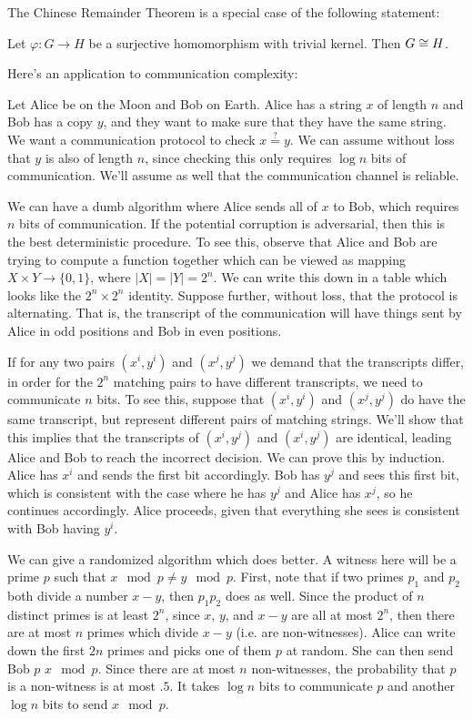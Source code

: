 The Chinese Remainder Theorem is a special case of the following statement:

\begin{lemma}
	Let $\varphi: G\rightarrow H$ be a surjective homomorphism with trivial kernel.  Then $G\cong H$.
\end{lemma}

Here's an application to communication complexity:

\begin{example}
Let Alice be on the Moon and Bob on Earth.  Alice has a string $x$ of length $n$ and Bob has a copy $y$, and they want to make sure that they have the same string. We want a communication protocol to check $x\overset{?}{=}y$.  We can assume without loss that $y$ is also of length $n$, since checking this only requires $\log{n}$ bits of communication.  We'll assume as well that the communication channel is reliable.

We can have a dumb algorithm where Alice sends all of $x$ to Bob, which requires $n$ bits of communication.  If the potential corruption is adversarial, then this is the best deterministic procedure.  To see this, observe that Alice and Bob are trying to compute a function together which can be viewed as mapping $X\times Y\rightarrow \{0,1\}$, where $|X|=|Y|=2^n$.  We can write this down in a table which looks like the $2^n\times 2^n$ identity.  Suppose further, without loss, that the protocol is alternating.  That is, the transcript of the communication will have things sent by Alice in odd positions and Bob in even positions.  

If for any two pairs $(x^i,y^i)$ and $(x^j,y^j)$ we demand that the transcripts differ, in order for the $2^n$ matching pairs to have different transcripts, we need to communicate $n$ bits.  To see this, suppose that $(x^i,y^i)$ and $(x^j,y^j)$ do have the same transcript, but represent different pairs of matching strings.  We'll show that this implies that the transcripts of $(x^i,y^j)$ and $(x^i,y^j)$ are identical, leading Alice and Bob to reach the incorrect decision.  We can prove this by induction.  Alice has $x^i$ and sends the first bit accordingly.  Bob has $y^j$ and sees this first bit, which is consistent with the case where he has $y^j$ and Alice has $x^j$, so he continues accordingly. Alice proceeds, given that everything she sees is consistent with Bob having $y^i$.

We can give a randomized algorithm which does better.  A witness here will be a prime $p$ such that $x\mod p\neq y \mod p$.  First, note that if two primes $p_1$ and $p_2$ both divide a number $x-y$, then $p_1p_2$ does as well.  Since the product of $n$ distinct primes is at least $2^n$, since $x$, $y$, and $x-y$ are all at most $2^n$, then there are at most $n$ primes which divide $x-y$ (i.e. are non-witnesses).  Alice can write down the first $2n$ primes and picks one of them $p$ at random.  She can then send Bob $p$ $x\mod p$.  Since there are at most $n$ non-witnesses, the probability that $p$ is a non-witness is at most $.5$.  It takes $\log{n}$ bits to communicate $p$ and another $\log{n}$ bits to send $x\mod p$.
\end{example}




